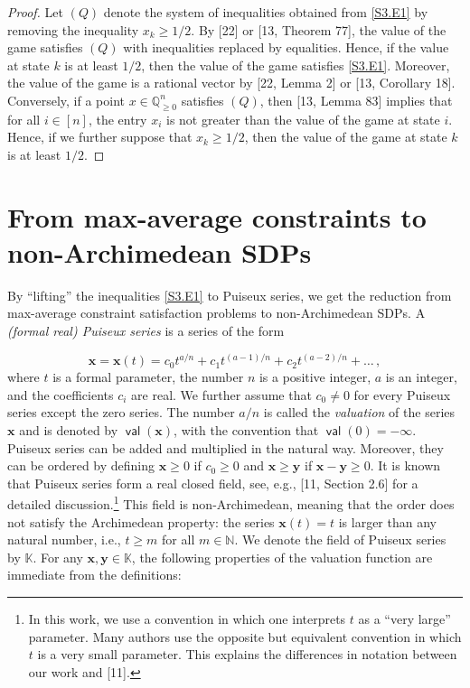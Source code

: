 \documentclass[10pt,a4paper]{article}
\theoremstyle{definition}
\begin{document}
\begin{proof}
Let $(Q)$ denote the system of inequalities obtained from \eqref{S3.E1} by removing the inequality $x_{k}\geq 1/2$. By [22] or [13, Theorem 77], the value of the game satisfies $(Q)$ with inequalities replaced by equalities. Hence, if the value at state $k$ is at least $1/2$, then the value of the game satisfies \eqref{S3.E1}. Moreover, the value of the game is a rational vector by [22, Lemma 2] or [13, Corollary 18]. Conversely, if a point $x\in\mathbb{Q}_{\geq 0}^{n}$ satisfies $(Q)$, then [13, Lemma 83] implies that for all $i\in[n]$, the entry $x_{i}$ is not greater than the value of the game at state $i$. Hence, if we further suppose that $x_{k}\geq 1/2$, then the value of the game at state $k$ is at least $1/2$. 

\end{proof}

\section*{From max-average constraints to non-Archimedean SDPs}

By “lifting” the inequalities \eqref{S3.E1} to Puiseux series, we get the reduction from max-average constraint satisfaction problems to non-Archimedean SDPs. A \emph{(formal real) Puiseux series} is a series of the form


\[
\bm{x}=\bm{x}(t)=c_{0}t^{a/n}+c_{1}t^{(a-1)/n}+c_{2}t^{(a-2)/n}+\dots\,,
\]
where $t$ is a formal parameter, the number $n$ is a positive integer, $a$ is an integer, and the coefficients $c_{i}$ are real. We further assume that $c_{0}\neq 0$ for every Puiseux series except the zero series. The number $a/n$ is called the \emph{valuation} of the series $\bm{x}$ and is denoted by $\operatorname*{\mathsf{val}}(\bm{x})$, with the convention that $\operatorname*{\mathsf{val}}(0)=-\infty$. Puiseux series can be added and multiplied in the natural way. Moreover, they can be ordered by defining $\bm{x}\geq 0$ if $c_{0}\geq 0$ and $\bm{x}\geq\bm{y}$ if $\bm{x}-\bm{y}\geq 0$. It is known that Puiseux series form a real closed field, see, e.g., [11, Section 2.6] for a detailed discussion.\footnote{In this work, we use a convention in which one interprets $t$ as a “very large” parameter. Many authors use the opposite but equivalent convention in which $t$ is a very small parameter. This explains the differences in notation between our work and [11].} This field is non-Archimedean, meaning that the order does not satisfy the Archimedean property: the series $\bm{x}(t)=t$ is larger than any natural number, i.e., $t\geq m$ for all $m\in\mathbb{N}$. We denote the field of Puiseux series by $\mathbb{K}$. For any $\bm{x},\bm{y}\in\mathbb{K}$, the following properties of the valuation function are immediate from the definitions:
\end{document}
